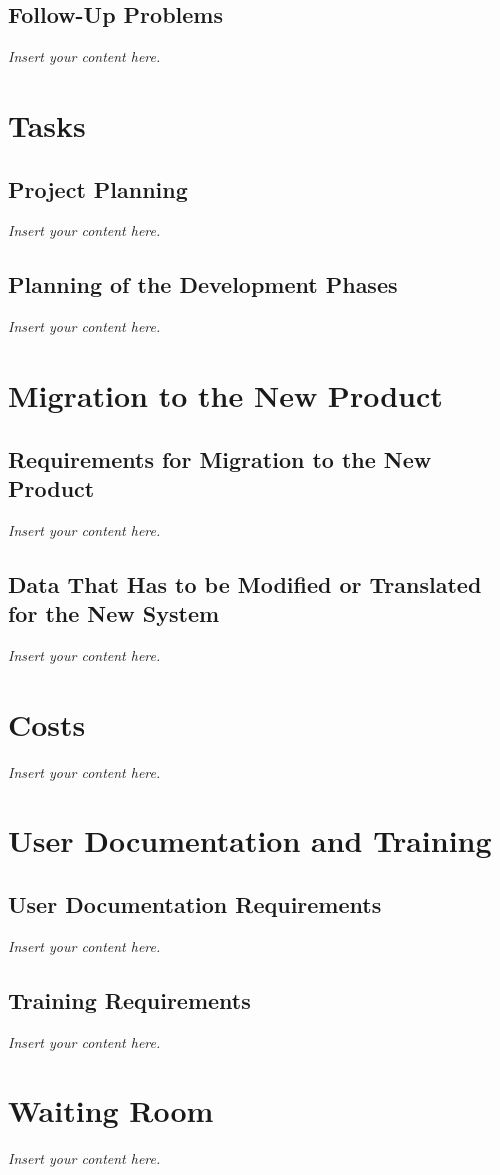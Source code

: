 \documentclass[12pt]{article}
\newcommand{\lips}{\textit{Insert your content here.}}
\begin{document}
\subsection{Follow-Up Problems}
\lips

\section{Tasks}
\subsection{Project Planning}
\lips
\subsection{Planning of the Development Phases}
\lips

\section{Migration to the New Product}
\subsection{Requirements for Migration to the New Product}
\lips
\subsection{Data That Has to be Modified or Translated for the New System}
\lips

\section{Costs}
\lips
\section{User Documentation and Training}
\subsection{User Documentation Requirements}
\lips
\subsection{Training Requirements}
\lips

\section{Waiting Room}
\lips
\end{document}
